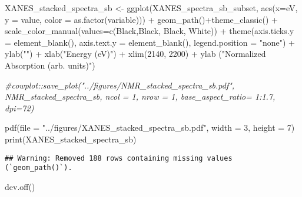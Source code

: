 \documentclass[
]{article}
\newenvironment{Shaded}{\begin{snugshade}}{\end{snugshade}}
\newcommand{\AttributeTok}[1]{\textcolor[rgb]{0.77,0.63,0.00}{#1}}
\newcommand{\CommentTok}[1]{\textcolor[rgb]{0.56,0.35,0.01}{\textit{#1}}}
\newcommand{\DecValTok}[1]{\textcolor[rgb]{0.00,0.00,0.81}{#1}}
\newcommand{\FunctionTok}[1]{\textcolor[rgb]{0.00,0.00,0.00}{#1}}
\newcommand{\NormalTok}[1]{#1}
\newcommand{\OtherTok}[1]{\textcolor[rgb]{0.56,0.35,0.01}{#1}}
\newcommand{\SpecialCharTok}[1]{\textcolor[rgb]{0.00,0.00,0.00}{#1}}
\newcommand{\StringTok}[1]{\textcolor[rgb]{0.31,0.60,0.02}{#1}}
\begin{document}
\begin{Shaded}
\begin{Highlighting}[]
\NormalTok{XANES\_stacked\_spectra\_sb }\OtherTok{\textless{}{-}} \FunctionTok{ggplot}\NormalTok{(XANES\_spectra\_sb\_subset, }\FunctionTok{aes}\NormalTok{(}\AttributeTok{x=}\NormalTok{eV, }\AttributeTok{y =}\NormalTok{ value, }\AttributeTok{color =} \FunctionTok{as.factor}\NormalTok{(variable))) }\SpecialCharTok{+} \FunctionTok{geom\_path}\NormalTok{()}\SpecialCharTok{+}\FunctionTok{theme\_classic}\NormalTok{() }\SpecialCharTok{+} \FunctionTok{scale\_color\_manual}\NormalTok{(}\AttributeTok{values=}\FunctionTok{c}\NormalTok{(}\StringTok{\textquotesingle{}Black\textquotesingle{}}\NormalTok{,}\StringTok{\textquotesingle{}Black\textquotesingle{}}\NormalTok{, }\StringTok{\textquotesingle{}Black\textquotesingle{}}\NormalTok{, }\StringTok{\textquotesingle{}White\textquotesingle{}}\NormalTok{)) }\SpecialCharTok{+} \FunctionTok{theme}\NormalTok{(}\AttributeTok{axis.ticks.y =} \FunctionTok{element\_blank}\NormalTok{(),  }\AttributeTok{axis.text.y =} \FunctionTok{element\_blank}\NormalTok{(), }\AttributeTok{legend.position =} \StringTok{"none"}\NormalTok{)  }\SpecialCharTok{+} \FunctionTok{ylab}\NormalTok{(}\StringTok{""}\NormalTok{) }\SpecialCharTok{+} \FunctionTok{xlab}\NormalTok{(}\StringTok{"Energy (eV)"}\NormalTok{) }\SpecialCharTok{+} \FunctionTok{xlim}\NormalTok{(}\DecValTok{2140}\NormalTok{, }\DecValTok{2200}\NormalTok{) }\SpecialCharTok{+} \FunctionTok{ylab}\NormalTok{ (}\StringTok{"Normalized Absorption (arb. units)"}\NormalTok{)}

\CommentTok{\#cowplot::save\_plot("../figures/NMR\_stacked\_spectra\_sb.pdf", NMR\_stacked\_spectra\_sb, ncol = 1, nrow = 1, base\_aspect\_ratio= 1:1.7, dpi=72)}

\FunctionTok{pdf}\NormalTok{(}\AttributeTok{file =} \StringTok{"../figures/XANES\_stacked\_spectra\_sb.pdf"}\NormalTok{, }\AttributeTok{width =} \DecValTok{3}\NormalTok{, }\AttributeTok{height =} \DecValTok{7}\NormalTok{) }
\FunctionTok{print}\NormalTok{(XANES\_stacked\_spectra\_sb)}
\end{Highlighting}
\end{Shaded}

\begin{verbatim}
## Warning: Removed 188 rows containing missing values (`geom_path()`).
\end{verbatim}

\begin{Shaded}
\begin{Highlighting}[]
\FunctionTok{dev.off}\NormalTok{()}
\end{Highlighting}
\end{Shaded}
\end{document}
